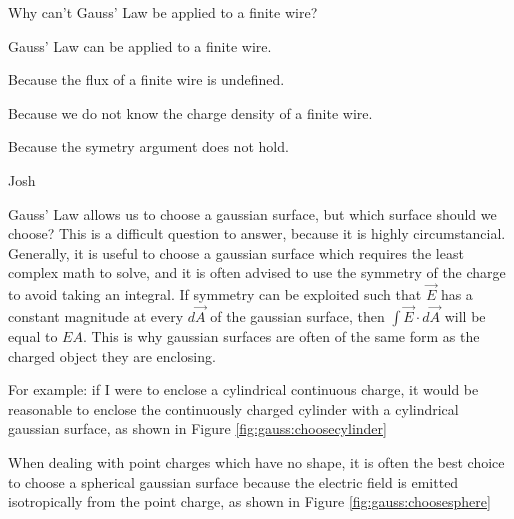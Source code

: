 \begin{checkpoint}\label{cp:gauss:gausswire}
	\begin{MCquestion}{Why can't Gauss' Law be applied to a finite wire?}
		\item Gauss' Law can be applied to a finite wire.
		\item Because the flux of a finite wire is undefined.
		\item Because we do not know the charge density of a finite wire.
		\item Because the symetry argument does not hold. \correct
	\end{MCquestion}
\end{checkpoint}

\begin{studentOpinion}{Josh}
	
	Gauss' Law allows us to choose a gaussian surface, but which surface should we choose? This is a difficult question to answer, because it is highly circumstancial. Generally, it is useful to choose a gaussian surface which requires the least complex math to solve, and it is often advised to use the symmetry of the charge to avoid taking an integral. If symmetry can be exploited such that $\vec E$ has a constant magnitude at every $d \vec A$ of the gaussian surface, then $\int \vec E \cdot d\vec A$ will be equal to $E A$. This is why gaussian surfaces are often of the same form as the charged object they are enclosing.
	
	For example: if I were to enclose a cylindrical continuous charge, it would be reasonable to enclose the continuously charged cylinder with a cylindrical gaussian surface, as shown in Figure \ref{fig:gauss:choosecylinder}
	
	
	When dealing with point charges which have no shape, it is often the best choice to choose a spherical gaussian surface because the electric field is emitted isotropically from the point charge, as shown in Figure \ref{fig:gauss:choosesphere}
	
	

\end{studentOpinion}
